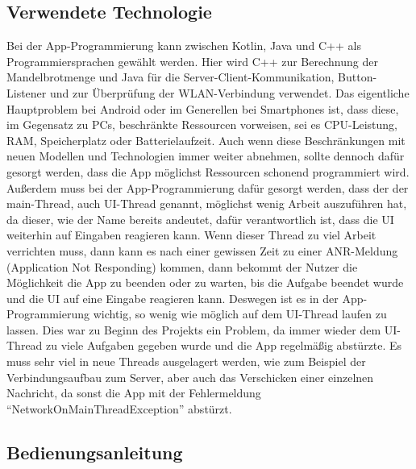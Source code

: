 \documentclass[12pt, onecolumn, notitlepage]{scrartcl}
\begin{document}
\subsection{Verwendete Technologie}
Bei der App-Programmierung kann zwischen Kotlin, Java und C++ als Programmiersprachen gewählt werden. Hier wird C++ zur Berechnung der Mandelbrotmenge und Java für die Server-Client-Kommunikation, Button-Listener und zur Überprüfung der WLAN-Verbindung verwendet. Das eigentliche Hauptproblem bei Android oder im Generellen bei Smartphones ist, dass diese, im Gegensatz zu PCs, beschränkte Ressourcen vorweisen, sei es CPU-Leistung, RAM, Speicherplatz oder Batterielaufzeit. Auch wenn diese Beschränkungen mit neuen Modellen und Technologien immer weiter abnehmen, sollte dennoch dafür gesorgt werden, dass die App möglichst Ressourcen schonend programmiert wird. Außerdem muss bei der App-Programmierung dafür gesorgt werden, dass der der main-Thread, auch UI-Thread genannt, möglichst wenig Arbeit auszuführen hat, da dieser, wie der Name bereits andeutet, dafür verantwortlich ist, dass die UI weiterhin auf Eingaben reagieren kann. Wenn dieser Thread zu viel Arbeit verrichten muss, dann kann es nach einer gewissen Zeit zu einer ANR-Meldung (Application Not Responding) kommen, dann bekommt der Nutzer die Möglichkeit die App zu beenden oder zu warten, bis die Aufgabe beendet wurde und die UI auf eine Eingabe reagieren kann. Deswegen ist es in der App-Programmierung wichtig, so wenig wie möglich auf dem UI-Thread laufen zu lassen. Dies war zu Beginn des Projekts ein Problem, da immer wieder dem UI-Thread zu viele Aufgaben gegeben wurde und die App regelmäßig abstürzte. Es muss sehr viel in neue Threads ausgelagert werden, wie zum Beispiel der Verbindungsaufbau zum Server, aber auch das Verschicken einer einzelnen Nachricht, da sonst die App mit der Fehlermeldung \enquote{NetworkOnMainThreadException} abstürzt.
\subsection{Bedienungsanleitung}
\end{document}
